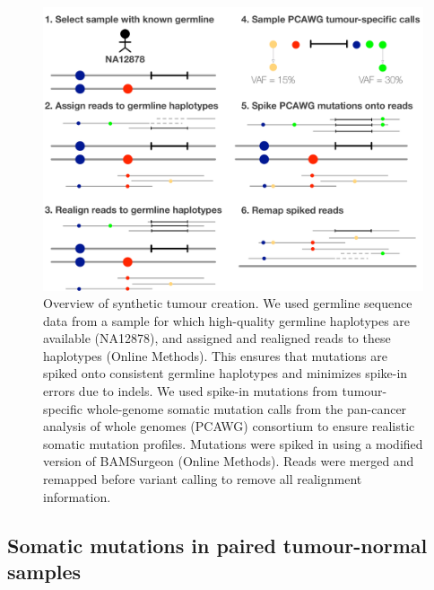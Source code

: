 \documentclass[notitlepage, twocolumn, 10pt]{article}
\begin{document}
\begin{figure}[tp]
    \includegraphics[width=\linewidth]{figures/syntumour}
    \caption{Overview of synthetic tumour creation. We used germline sequence data from a sample for which high-quality germline haplotypes are available (NA12878), and assigned and realigned reads to these haplotypes (Online Methods). This ensures that mutations are spiked onto consistent germline haplotypes and minimizes spike-in errors due to indels. We used spike-in mutations from tumour-specific whole-genome somatic mutation calls from the pan-cancer analysis of whole genomes (PCAWG) consortium \cite{RN471} to ensure realistic somatic mutation profiles. Mutations were spiked in using a modified version of BAMSurgeon \cite{RN147} (Online Methods). Reads were merged and remapped before variant calling to remove all realignment information.}
    \label{fig:syntumour}
\end{figure}

\subsection*{Somatic mutations in paired tumour-normal samples}
\end{document}
